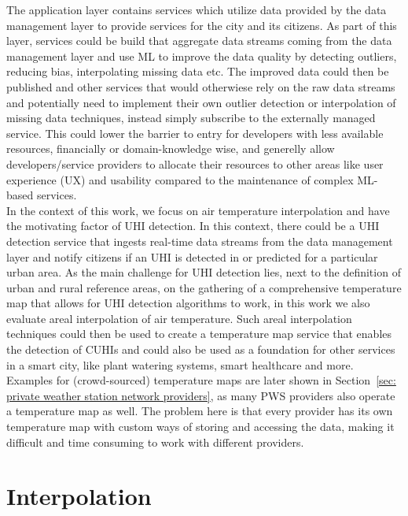 The application layer contains services which utilize data provided by the data management layer to provide services for the city and its citizens. As part of this layer, services could be build that aggregate data streams coming from the data management layer and use ML to improve the data quality by detecting outliers, reducing bias, interpolating missing data etc. The improved data could then be published and other services that would otherwiese rely on the raw data streams and potentially need to implement their own outlier detection or interpolation of missing data techniques, instead simply subscribe to the externally managed service. This could lower the barrier to entry for developers with less available resources, financially or domain-knowledge wise, and generelly allow developers/service providers to allocate their resources to other areas like user experience (UX) and usability compared to the maintenance of complex ML-based services.\\
In the context of this work, we focus on air temperature interpolation and have the motivating factor of UHI detection. In this context, there could be a UHI detection service that ingests real-time data streams from the data management layer and notify citizens if an UHI is detected in or predicted for a particular urban area. As the main challenge for UHI detection lies, next to the definition of urban and rural reference areas, on the gathering of a comprehensive temperature map that allows for UHI detection algorithms to work, in this work we also evaluate areal interpolation of air temperature. Such areal interpolation techniques could then be used to create a temperature map service that enables the detection of CUHIs and could also be used as a foundation for other services in a smart city, like plant watering systems, smart healthcare and more. Examples for (crowd-sourced) temperature maps are later shown in Section~\ref{sec: private weather station network providers}, as many PWS providers also operate a temperature map as well. The problem here is that every provider has its own temperature map with custom ways of storing and accessing the data, making it difficult and time consuming to work with different providers.

\section{Interpolation}

